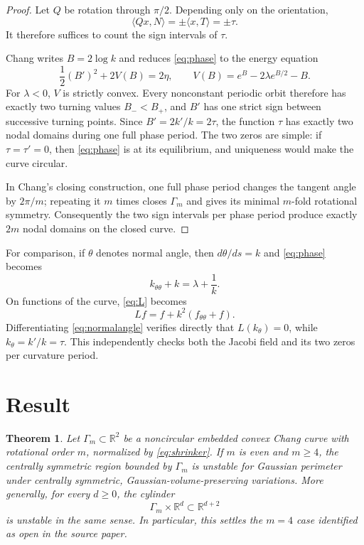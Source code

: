 \documentclass[11pt]{article}
\newtheorem{theorem}{Theorem}
\newcommand{\R}{\mathbb R}
\begin{document}
\begin{proof}
Let $Q$ be rotation through $\pi/2$.  Depending only on the orientation,
\[
 \langle Qx,N\rangle=\pm\langle x,T\rangle=\pm\tau.
\]
It therefore suffices to count the sign intervals of $\tau$.

Chang writes $B=2\log k$ and reduces \eqref{eq:phase} to the energy equation
\begin{equation}\label{eq:energy}
 \frac12(B')^2+2V(B)=2\eta,
 \qquad
 V(B)=e^B-2\lambda e^{B/2}-B.
\end{equation}
For $\lambda<0$, $V$ is strictly convex.  Every nonconstant periodic orbit
therefore has exactly two turning values $B_-<B_+$, and $B'$ has one strict
sign between successive turning points.  Since $B'=2k'/k=2\tau$, the
function $\tau$ has exactly two nodal domains during one full phase period.
The two zeros are simple: if $\tau=\tau'=0$, then \eqref{eq:phase} is at its
equilibrium, and uniqueness would make the curve circular.

In Chang's closing construction, one full phase period changes the tangent
angle by $2\pi/m$; repeating it $m$ times closes $\Gamma_m$ and gives its
minimal $m$-fold rotational symmetry.  Consequently the two sign intervals
per phase period produce exactly $2m$ nodal domains on the closed curve.
\end{proof}

For comparison, if $\theta$ denotes normal angle, then $d\theta/ds=k$ and
\eqref{eq:phase} becomes
\begin{equation}\label{eq:normalangle}
 k_{\theta\theta}+k=\lambda+\frac1k.
\end{equation}
On functions of the curve, \eqref{eq:L} becomes
\[
 Lf=f+k^2(f_{\theta\theta}+f).
\]
Differentiating \eqref{eq:normalangle} verifies directly that
$L(k_\theta)=0$, while $k_\theta=k'/k=\tau$.  This independently checks both
the Jacobi field and its two zeros per curvature period.

\section{Result}

\begin{theorem}\label{thm:main}
Let $\Gamma_m\subset\R^2$ be a noncircular embedded convex Chang curve with
rotational order $m$, normalized by \eqref{eq:shrinker}.  If $m$ is even and
$m\geq4$, the centrally symmetric region bounded by $\Gamma_m$ is unstable
for Gaussian perimeter under centrally symmetric, Gaussian-volume-preserving
variations.  More generally, for every $d\geq0$, the cylinder
\[
 \Gamma_m\times\R^d\subset\R^{d+2}
\]
is unstable in the same sense.  In particular, this settles the $m=4$ case
identified as open in the source paper.
\end{theorem}
\end{document}
